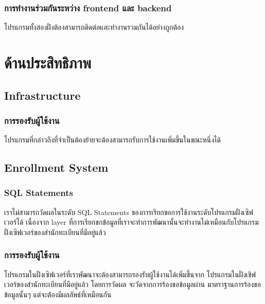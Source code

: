 \subsubsection{การทำงานร่วมกันระหว่าง frontend และ backend}

โปรแกรมทั้งสองฝั่งต้องสามารถติดต่อและทำงานรวมกันได้อย่างถูกต้อง

\section{ด้านประสิทธิภาพ}

\subsection{Infrastructure}

\subsubsection{การรองรับผู้ใช้งาน}

โปรแกรมที่กล่าวถึงที่จำเป็นต้องย้ายจะต้องสามารถรับการใช้งานเพิ่มขึ้นในขณะหนึ่งได้

\subsection{Enrollment System}

\subsubsection{SQL Statements}

เราไม่สามารถวัดผลในระดับ SQL Statements ของการเรียกขอการใช้งานระดับโปรแกรมฝั่งเซิฟเวอร์ได้ เนื่องจาก layer ที่การเรียกขกข้อมูลที่เราจะทำการพัฒนานั้นจะทำงานไม่เหมือนกับโปรแกรมฝั่งเซิฟเวอร์ของสำนักทะเบียนที่มีอยู่แล้ว

\subsubsection{การรองรับผู้ใช้งาน}

โปรแกรมในฝั่งเซิฟเวอร์ที่เราพัฒนาจะต้องสามารถรองรับผู้ใช้งานได้เพิ่มขึ้นจาก โปรแกรมในฝั่งเชิฟเวอร์ของสำนักทะเบียนที่มีอยู่แล้ว โดยการวัดผล จะวัดจากการร้องขอข้อมูลผ่าน มาตราฐานการร้องขอข้อมูลนั้นๆ แต่จะต้่องมีผลลัพธ์ที่เหมือนกัน
